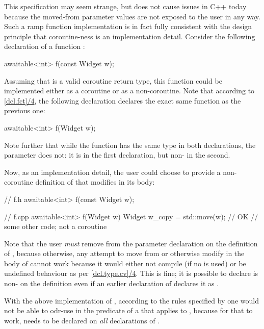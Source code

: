 This specification may seem strange, but does not cause issues in C++ today because the moved-from parameter values are not exposed to the user in any way. Such a ramp function implementation is in fact fully consistent with the design principle that coroutine-ness is an implementation detail. Consider the following declaration of a function :
\begin{codeblock}
awaitable<int> f(const Widget w);
\end{codeblock}
Assuming that  is a valid coroutine return type, this function could be  implemented either as a coroutine or as a non-coroutine. Note that according to \href{https://eel.is/c++draft/dcl.fct#4.sentence-2}{[dcl.fct]/4}, the following declaration declares the exact same function as the previous one:
\begin{codeblock}
awaitable<int> f(Widget w);
\end{codeblock}
Note further that while the function  has the same type in both declarations, the parameter  does not: it is  in the first declaration, but non- in the second.

Now, as an implementation detail, the user could choose to provide a non-coroutine definition of  that modifies  in its body:
\begin{codeblock}
// f.h
awaitable<int> f(const Widget w);

// f.cpp
awaitable<int> f(Widget w) {
  Widget w_copy = std::move(w); // OK
  // some other code; not a coroutine
}
\end{codeblock}
Note that the user \emph{must} remove  from the parameter declaration on the definition of , because otherwise, any attempt to move from  or otherwise modify  in the body of  cannot work because it would either not compile (if no  is used) or be undefined behaviour as per \href{https://eel.is/c++draft/dcl.type.cv#4.sentence-1}{[dcl.type.cv]/4}. This is fine; it is possible to declare  is non- on the definition even if an earlier declaration of  declares it as .

With the above implementation of , according to the rules specified by \cite{P2900R8} one would not be able to odr-use  in the predicate of a  that applies to , because for that to work,  needs to be declared  on \emph{all} declarations of .

